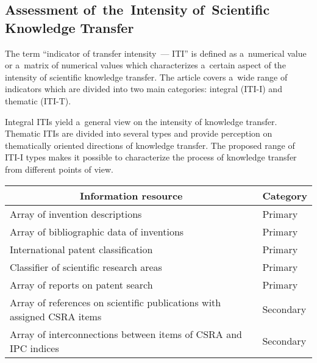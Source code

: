 \begin{multicols}{2}
\section*{Assessment of~the~Intensity of~Scientific Knowledge Transfer}

\noindent
    The term ``indicator of transfer intensity~--- ITI'' is defined as a~numerical value 
or a~matrix of numerical values which characterizes a~certain aspect of the intensity 
of scientific knowledge transfer. The article covers a~wide range of indicators which 
are divided into two main categories: integral (ITI-I) and thematic (ITI-T).
    
    Integral ITIs yield a~general view on the intensity of knowledge transfer. Thematic 
ITIs are divided into several types and provide perception on thematically 
oriented directions of knowledge transfer. The proposed range of ITI-I types makes 
it possible to characterize the process of knowledge transfer from different points of 
view.

\begin{table*}\small %
\begin{center}
\vspace*{2ex}

\begin{tabular}{ll}
\hline
\multicolumn{1}{c}{Information resource}&\multicolumn{1}{c}{Category}\\
\hline
Array of invention descriptions&Primary\\
Array of bibliographic data of inventions&Primary\\
International patent classification&Primary\\
Classifier of scientific research areas &Primary\\
Array of reports on patent search&Primary\\
Array of references on scientific publications with assigned CSRA 
items&Secondary\\
Array of interconnections between items of CSRA and IPC indices&Secondary\\
\hline
\end{tabular}
\end{center}
\end{table*}


\end{multicols}
